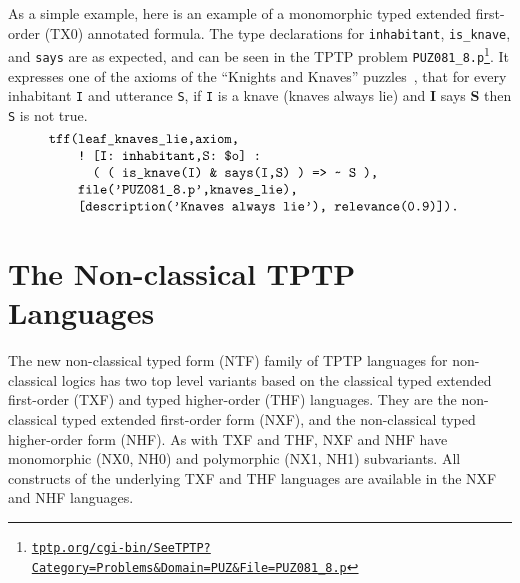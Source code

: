 \documentclass{ceurart}
\begin{document}
As a simple example, here is an example of a monomorphic typed extended first-order (TX0) 
annotated formula.
The type declarations for {\tt inhabitant}, {\tt is\_knave}, and {\tt says} are as expected,
and can be seen in the TPTP problem {\tt PUZ081\_8.p}\footnote{%
\href{https://tptp.org/cgi-bin/SeeTPTP?Category=Problems&Domain=PUZ&File=PUZ081_8.p}{\tt tptp.org/cgi-bin/SeeTPTP?Category=Problems\&Domain=PUZ\&File=PUZ081\_8.p}}.
It expresses one of the axioms of the ``Knights and Knaves'' puzzles~\cite{Smu78}, that for every 
inhabitant {\tt I} and utterance {\tt S}, if {\tt I} is a knave (knaves always lie) and {\bf I}
says {\bf S} then {\tt S} is not true.
\[
\begin{minipage}{\textwidth}
\begin{verbatim}
    tff(leaf_knaves_lie,axiom,
        ! [I: inhabitant,S: $o] : 
          ( ( is_knave(I) & says(I,S) ) => ~ S ),
        file('PUZ081_8.p',knaves_lie),
        [description('Knaves always lie'), relevance(0.9)]).
\end{verbatim}
\end{minipage}
\]

\section{The Non-classical TPTP Languages}
\label{NonClassicalTPTPLanguages}

The new non-classical typed form (NTF) family of TPTP languages for non-classical logics has two 
top level variants based on the classical typed extended first-order (TXF) and typed higher-order 
(THF) languages.
They are the non-classical typed extended first-order form (NXF), and the non-classical 
typed higher-order form (NHF).
As with TXF and THF, NXF and NHF have mono\-morphic (NX0, NH0) and polymorphic (NX1, NH1) 
subvariants.
All constructs of the underlying TXF and THF languages are available in the NXF and NHF languages.
\end{document}
